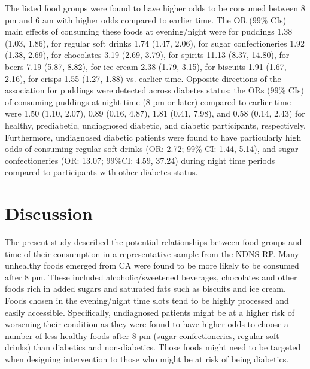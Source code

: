 \documentclass{bmcart}
\begin{document}
The listed food groups were found to have higher odds to be consumed between 8 pm and 6 am with higher odds compared to earlier time. The OR (99\% CIs) main effects of consuming these foods at evening/night were for puddings 1.38 (1.03, 1.86), for regular soft drinks 1.74 (1.47, 2.06), for sugar confectioneries 1.92 (1.38, 2.69), for chocolates 3.19 (2.69, 3.79), for spirits 11.13 (8.37, 14.80), for beers 7.19 (5.87, 8.82), for ice cream 2.38 (1.79, 3.15), for biscuits 1.91 (1.67, 2.16), for crisps 1.55 (1.27, 1.88) vs. earlier time. Opposite directions of the association for puddings were detected across diabetes status: the ORs (99\% CIs) of consuming puddings at night time (8 pm or later) compared to earlier time were 1.50 (1.10, 2.07),	0.89 (0.16, 4.87),	1.81 (0.41, 7.98), and	0.58 (0.14, 2.43) for healthy, prediabetic, undiagnosed diabetic, and diabetic participants, respectively. Furthermore, undiagnosed diabetic patients were found to have particularly high odds of consuming regular soft drinks (OR: 2.72; 99\% CI: 1.44, 5.14), and sugar confectioneries (OR: 13.07; 99\%CI: 4.59, 37.24) during night time periods compared to participants with other diabetes status. 




\section*{Discussion}


The present study described the potential relationships between food groups and time of their consumption in a representative sample from the NDNS RP. Many unhealthy foods emerged from CA were found to be more likely to be consumed after 8 pm. These included alcoholic/sweetened beverages, chocolates and other foods rich in added sugars and saturated fats such as biscuits and ice cream. Foods chosen in the evening/night time slots tend to be highly processed and easily accessible. Specifically, undiagnosed patients might be at a higher risk of worsening their condition as they were found to have higher odds to choose a number of less healthy foods after 8 pm (sugar confectioneries, regular soft drinks) than diabetics and non-diabetics. Those foods might need to be targeted when designing intervention to those who might be at risk of being diabetics. 
\end{document}
